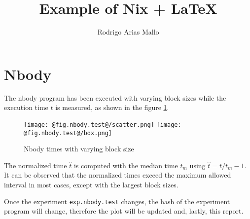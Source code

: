 \documentclass{article}
\begin{document}
\title{Example of Nix + \LaTeX{}}
\author{Rodrigo Arias Mallo}

\maketitle

\section{Nbody}
The nbody program has been executed with varying block sizes while the execution 
time $t$ is measured, as shown in the figure \ref{fig:nbody.test}.
%
\begin{figure}[h]
    \centering
		\texttt{[image: @fig.nbody.test@/scatter.png]}
		\texttt{[image: @fig.nbody.test@/box.png]}
		\caption{Nbody times with varying block size}
		\label{fig:nbody.test}
\end{figure}
%
The normalized time $\hat t$ is computed with the median time $t_m$ using $ \hat 
t = t / t_{m} - 1 $. It can be observed that the normalized times exceed the 
maximum allowed interval in most cases, except with the largest block sizes.

Once the experiment \texttt{exp.nbody.test} changes, the hash of the experiment 
program will change, therefore the plot will be updated and, lastly, this 
report.
\end{document}
